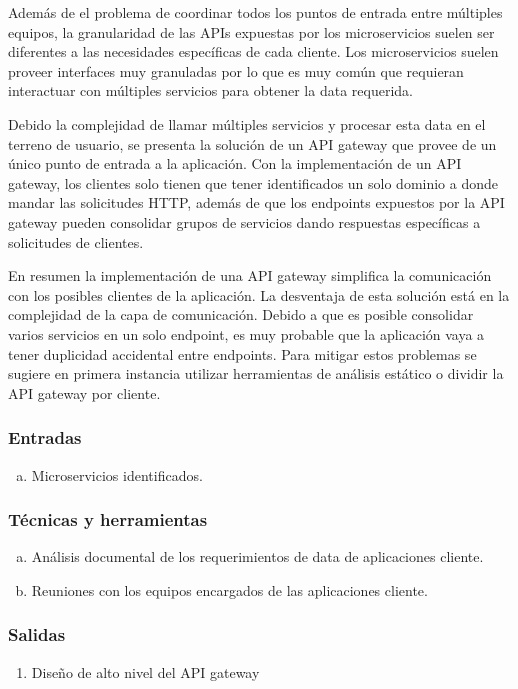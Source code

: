 Además de el problema de coordinar todos los puntos de entrada entre múltiples equipos,
la granularidad de las APIs expuestas por los microservicios suelen ser diferentes
a las necesidades específicas de cada cliente.
Los microservicios suelen proveer interfaces muy granuladas por lo que es muy común que
requieran interactuar con múltiples servicios para obtener la data requerida.

Debido la complejidad de llamar múltiples servicios y procesar esta data en el terreno de usuario,
se presenta la solución de un API gateway que provee de un único punto de entrada a la aplicación. 
Con la implementación de un API gateway, los clientes solo tienen que tener identificados un solo
dominio a donde mandar las solicitudes HTTP, además de que los endpoints expuestos por la API gateway
pueden consolidar grupos de servicios dando respuestas específicas a solicitudes de clientes.

En resumen la implementación de una API gateway simplifica la comunicación con los posibles clientes
de la aplicación.
La desventaja de esta solución está en la complejidad de la capa de comunicación.
Debido a que es posible consolidar varios servicios en un solo endpoint, es muy probable
que la aplicación vaya a tener duplicidad accidental entre endpoints.
Para mitigar estos problemas se sugiere en primera instancia utilizar herramientas de
análisis estático o dividir la API gateway por cliente.


\subsubsection*{Entradas}
\begin{enumerate}[a.]
  \item Microservicios identificados.
\end{enumerate}

\subsubsection*{Técnicas y herramientas}
\begin{enumerate}[a.]
  \item Análisis documental de los requerimientos de data de aplicaciones cliente.
  \item Reuniones con los equipos encargados de las aplicaciones cliente.
\end{enumerate}

\subsubsection*{Salidas}
\begin{enumerate}
  \item Diseño de alto nivel del API gateway
\end{enumerate}

